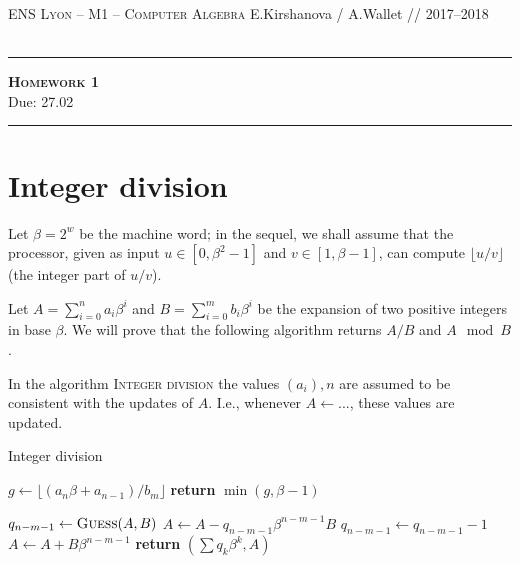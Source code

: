 \documentclass[11pt]{exam}
\theoremstyle{definition}
\begin{document}
{\noindent
   \textsc{ENS Lyon --  M1 -- Computer Algebra}
 \hfill { E.Kirshanova / A.Wallet // 2017--2018\\
   	}\\
  }
  \hrule
  \begin{center}
    {\Large\textbf{
   \textsc{Homework 1} \\[5pt]
    }
	Due:  27.02
	} 
  \end{center}
  \hrule \vspace{5mm}

\thispagestyle{empty}

\vspace{0.2cm}


\section{Integer division}

Let $\beta = 2^w$ be the machine word; in the sequel, we shall assume
that the processor, given as input $u \in [0, \beta^2 - 1]$ and $v \in
[1, \beta - 1]$, can compute $\lfloor u/v\rfloor$ (the integer part of
$u/v$).

Let $A = \sum_{i=0}^{n} a_i \beta^i$ and $B = \sum_{i=0}^m b_i \beta^i$ be
the expansion of two positive integers in base $\beta$.
We will prove that the following algorithm returns $A/B$ and $A\mod B$.

{\color{red} In the algorithm \textsc{Integer division} the values $(a_i), n$ are assumed to be consistent with the updates of $A$. I.e., whenever $A \gets ...$, these values are updated.}

\begin{algorithm}
\caption*{Integer division}
\begin{algorithmic}[0]
\State $g\gets \lfloor (a_n \beta + a_{n-1}) / b_m \rfloor$
\State \textbf{return} $\min(g,\beta-1)$
\EndProcedure
\medskip

\State $q_{n-m-1}\gets \textsc{Guess}(A,B)$
\State $A \gets A-q_{n-m-1}\beta^{n-m-1}B$
 
   \State $q_{n-m-1} \gets q_{n-m-1} - 1$
   \State $A \gets A + B \beta^{n-m-1}$
\EndWhile
\EndWhile
\State \textbf{return} $(\sum q_k \beta^k, A)$
\EndProcedure
\end{algorithmic}
\end{algorithm}
\end{document}

